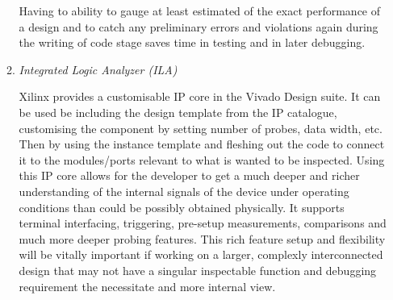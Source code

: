 \documentclass[11pt]{article}
\begin{document}
\begin{preview}
\begin{enumerate}
\begin{enumerate}
        Having to ability to gauge at least estimated of the exact performance of a design and to catch any preliminary errors and violations again during the writing of code stage saves time in testing and in later debugging. 

        \item \textit{Integrated Logic Analyzer (ILA)}

        Xilinx provides a customisable IP core in the Vivado Design suite. It can be used be including the design template from the IP catalogue, customising the component by setting number of probes, data width, etc. Then by using the instance template and fleshing out the code to connect it to the modules/ports relevant to what is wanted to be inspected. Using this IP core allows for the developer to get a much deeper and richer understanding of the internal signals of the device under operating conditions than could be possibly obtained physically. It supports terminal interfacing, triggering, pre-setup measurements, comparisons and much more deeper probing features. This rich feature setup and flexibility will be vitally important if working on a larger, complexly interconnected design that may not have a singular inspectable function and debugging requirement the necessitate and more internal view.
\end{enumerate}



\end{enumerate}
\end{preview}
\end{document}
